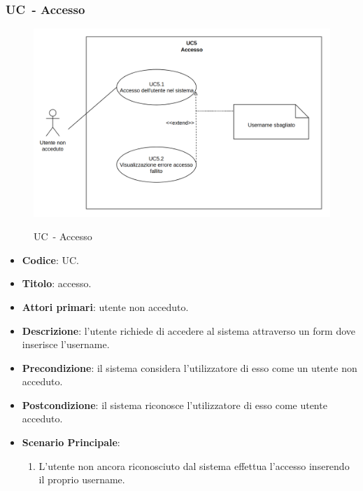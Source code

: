 \subsubsection{UC\theuccount\ - Accesso}
		\begin{figure}[H]
			\centering
				\includegraphics[width=\columnwidth]{img/UC5.png}\\
			\caption{UC\theuccount\ - Accesso}
		\end{figure}
	\begin{itemize}
		\item \textbf{Codice}: UC\theuccount.
		\item \textbf{Titolo}: accesso.
		\item \textbf{Attori primari}: utente non acceduto.
		\item \textbf{Descrizione}: l'utente richiede di accedere al sistema attraverso un form dove inserisce l'username.
		\item \textbf{Precondizione}: il sistema considera l’utilizzatore di esso come un utente non acceduto.
		\item \textbf{Postcondizione}: il sistema riconosce l'utilizzatore di esso come utente acceduto.
		\item \textbf{Scenario Principale}:
		\begin{enumerate}
			\item L'utente non ancora riconosciuto dal sistema effettua l'accesso inserendo il proprio username.
		\end{enumerate}
	\end{itemize}
	
